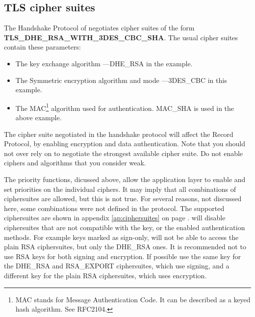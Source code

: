 \subsection{TLS cipher suites}
\par 
The Handshake Protocol of \tlsI{} negotiates cipher suites 
of the form \\
{\bf TLS\_DHE\_RSA\_WITH\_3DES\_CBC\_SHA}.
The usual cipher suites contain these parameters:
\begin{itemize}
\item The key exchange algorithm ---DHE\_RSA in the example.
\item The Symmetric encryption algorithm and mode ---3DES\_CBC in this
example.
\item The MAC\footnote{MAC stands for Message Authentication Code. It can
be described as a keyed hash algorithm. See RFC2104.} algorithm used for authentication.
MAC\_SHA is used in the above example.
\end{itemize}

The cipher suite negotiated in the handshake protocol will affect
the Record Protocol, by enabling encryption and data authentication.
Note that you should not over rely on \tls{} to negotiate the strongest 
available cipher suite. Do not enable ciphers and algorithms that you consider weak.
\par
The priority functions, dicussed above, allow the application layer to enable
and set priorities on the individual ciphers. It may imply that all combinations of ciphersuites
are allowed, but this is not true. For several reasons, not discussed here, some combinations 
were not defined in the \tls{} protocol. The supported ciphersuites are shown
in appendix \ref{ap:ciphersuites} on page \pageref{ap:ciphersuites}.
\gnutls{} will disable ciphersuites that are not compatible with the key, or
the enabled authentication methods.
For example keys marked as sign-only, will not be able to
access the plain RSA ciphersuites, but only the DHE\_RSA ones. It is
recommended not to use RSA keys for both signing and encryption. If possible
use the same key for the DHE\_RSA and RSA\_EXPORT ciphersuites, which use signing,
and a different key for the plain RSA ciphersuites, which uses encryption.

\addvspace{1.5cm}
